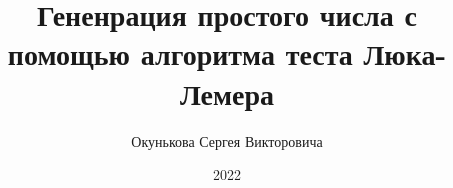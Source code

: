 \documentclass[spec, och, labwork]{shiza}
\begin{document}
\chair{}

\title{Гененрация простого числа с помощью алгоритма теста Люка-Лемера}






\author{Окунькова Сергея Викторовича}








\date{2022}

\maketitle

\end{document}
